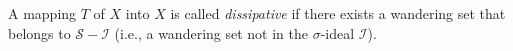 A mapping $T$ of $X$ into $X$ is called \textit{dissipative} if there exists a wandering set that belongs to $\mathcal{S} - \mathcal{I}$ (i.e., a wandering set not in the $\sigma$-ideal $\mathcal{I}$).
